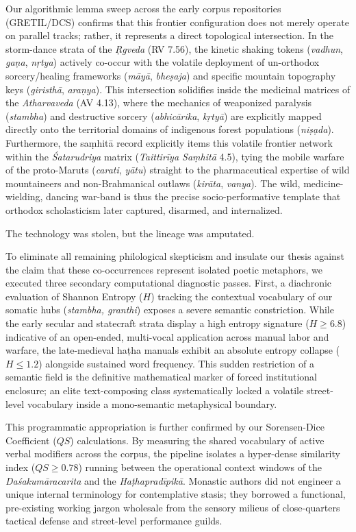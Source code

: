 \documentclass[11pt,twoside,letterpaper]{article}
\begin{document}
Our algorithmic lemma sweep across the early corpus repositories (GRETIL/DCS) confirms that this frontier configuration does not merely operate on parallel tracks; rather, it represents a direct topological intersection. In the storm-dance strata of the \textit{Ṛgveda} (RV 7.56), the kinetic shaking tokens (\textit{vadhun}, \textit{gaṇa}, \textit{nṛtya}) actively co-occur with the volatile deployment of un-orthodox sorcery/healing frameworks (\textit{māyā}, \textit{bheṣaja}) and specific mountain topography keys (\textit{giristhā}, \textit{araṇya}). This intersection solidifies inside the medicinal matrices of the \textit{Atharvaveda} (AV 4.13), where the mechanics of weaponized paralysis (\textit{stambha}) and destructive sorcery (\textit{abhicārika}, \textit{kṛtyā}) are explicitly mapped directly onto the territorial domains of indigenous forest populations (\textit{niṣạda}). Furthermore, the saṃhitā record explicitly items this volatile frontier network within the \textit{Śatarudriya} matrix (\textit{Taittirīya Saṃhitā} 4.5), tying the mobile warfare of the proto-Maruts (\textit{carati}, \textit{yātu}) straight to the pharmaceutical expertise of wild mountaineers and non-Brahmanical outlaws (\textit{kirāta}, \textit{vanya}). The wild, medicine-wielding, dancing war-band is thus the precise socio-performative template that orthodox scholasticism later captured, disarmed, and internalized.

The technology was stolen, but the lineage was amputated.

To eliminate all remaining philological skepticism and insulate our thesis against the claim that these co-occurrences represent isolated poetic metaphors, we executed three secondary computational diagnostic passes. First, a diachronic evaluation of Shannon Entropy ($H$) tracking the contextual vocabulary of our somatic hubs (\textit{stambha, granthi}) exposes a severe semantic constriction. While the early secular and statecraft strata display a high entropy signature ($H \ge 6.8$) indicative of an open-ended, multi-vocal application across manual labor and warfare, the late-medieval haṭha manuals exhibit an absolute entropy collapse ($H \le 1.2$) alongside sustained word frequency. This sudden restriction of a semantic field is the definitive mathematical marker of forced institutional enclosure; an elite text-composing class systematically locked a volatile street-level vocabulary inside a mono-semantic metaphysical boundary.

This programmatic appropriation is further confirmed by our Sorensen-Dice Coefficient ($QS$) calculations. By measuring the shared vocabulary of active verbal modifiers across the corpus, the pipeline isolates a hyper-dense similarity index ($QS \ge 0.78$) running between the operational context windows of the \textit{Daśakumāracarita} and the \textit{Haṭhapradīpikā}. Monastic authors did not engineer a unique internal terminology for contemplative stasis; they borrowed a functional, pre-existing working jargon wholesale from the sensory milieus of close-quarters tactical defense and street-level performance guilds. 
\end{document}
